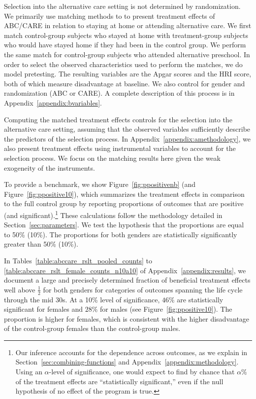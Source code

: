 Selection into the alternative care setting is not determined by randomization. We primarily use matching methods to  to present treatment effects of ABC/CARE in relation to staying at home or attending alternative care. We first match control-group subjects who stayed at home with treatment-group subjects who would have stayed home if they had been in the control group. We perform the same match for control-group subjects who attended alternative preschool. In order to select the observed characteristics used to perform the matches, we do model pretesting. The resulting variables are the Apgar scores and the HRI score, both of which measure disadvantage at baseline. We also control for gender and randomization (ABC or CARE). A complete description of this process is in Appendix~\ref{appendix:bvariables}. 

Computing the matched treatment effects controls for the selection into the alternative care setting, assuming that the observed variables sufficiently describe the predictors of the selection process. In Appendix~\ref{appendix:amethodology}, we also present treatment effects using instrumental variables to account for the selection process. We focus on the matching results here given the weak exogeneity of the instruments. 

To provide a benchmark, we show Figure~\ref{fig:ppositivenb} (and Figure~\ref{fig:ppositive10}), which summarizes the treatment effects in comparison to the full control group by reporting proportions of outcomes that are positive (and significant).\footnote{Our inference accounts for the dependence across outcomes, as we explain in Section~\ref{sec:combining-functions} and Appendix~\ref{appendix:methodology}. Using an $\alpha$-level of significance, one would expect to find by chance that $\alpha\%$ of the treatment effects are ``statistically significant,'' even if the null hypothesis of no effect of the program is true.} These calculations follow the methodology detailed in Section~\ref{sec:parameters}. We test the hypothesis that the proportions are equal to 50\% (10\%). The proportions for both genders are statistically significantly greater than 50\% (10\%). 

In Tables~\ref{table:abccare_rslt_pooled_counts} to \ref{table:abccare_rslt_female_counts_n10a10} of Appendix~\ref{appendix:results}, we document a large and precisely determined fraction of beneficial treatment effects well above $\frac{1}{2}$ for both genders for categories of outcomes spanning the life cycle through the mid 30s. At a 10\% level of significance, $46\%$ are statistically significant for females and $28\%$ for males (see Figure~\ref{fig:ppositive10}). The proportion is higher for females, which is consistent with the higher disadvantage of the control-group females than the control-group males. 

